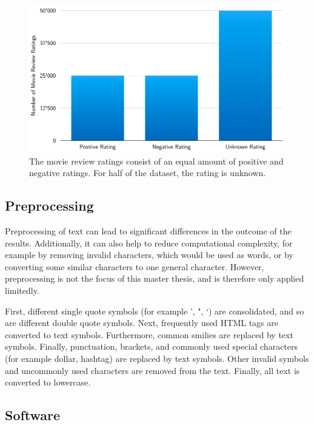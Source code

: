 \begin{figure}
	\centering
	\includegraphics[width=1.0\textwidth]{5experiments/movie-ratings-distribution.png}
	\caption{The movie review ratings consist of an equal amount of positive and negative ratings. For half of the dataset, the rating is unknown.}
	\label{fig:5:movie-ratings-distribution}
\end{figure}


\subsection{Preprocessing}\label{preprocessing}

Preprocessing of text can lead to significant differences in the outcome of the results. Additionally, it can also help to reduce computational complexity, for example by removing invalid characters, which would be used as words, or by converting some similar characters to one general character. However, preprocessing is not the focus of this master thesis, and is therefore only applied limitedly.

First, different single quote symbols (for example ', ", `) are consolidated, and so are different double quote symbols. Next, frequently used HTML tags are converted to text symbols. Furthermore, common smilies are replaced by text symbols. Finally, punctuation, brackets, and commonly used special characters (for example dollar, hashtag) are replaced by text symbols. Other invalid symbols and uncommonly used characters are removed from the text. Finally, all text is converted to lowercase.

\subsection{Software}\label{software}

